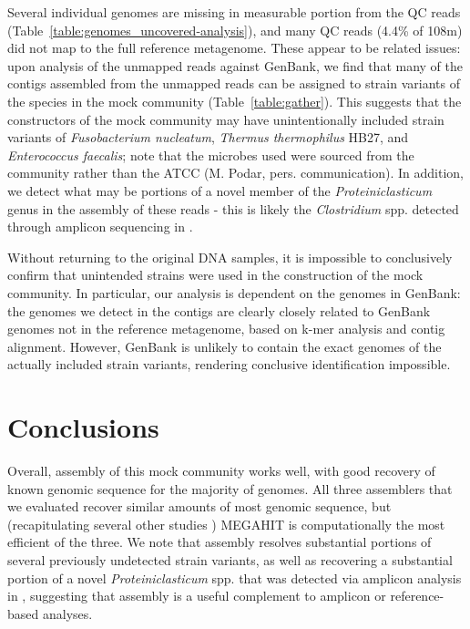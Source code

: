 \documentclass[11pt]{article}
\begin{document}
Several individual genomes are missing in measurable portion from the
QC reads (Table~\ref{table:genomes_uncovered-analysis}), and many QC
reads (4.4\% of 108m) did not map to the full reference metagenome.
These appear to be related issues: upon analysis of the unmapped reads
against GenBank, we find that many of the contigs assembled from the
unmapped reads can be assigned to strain variants of the species in
the mock community (Table~\ref{table:gather}).  This suggests that the
constructors of the mock community may have unintentionally included
strain variants of {\em Fusobacterium nucleatum}, {\em Thermus
  thermophilus} HB27, and {\em Enterococcus faecalis}; note that the
microbes used were sourced from the community rather than the ATCC
(M. Podar, pers.  communication).  In addition, we detect what may be
portions of a novel member of the {\em Proteiniclasticum} genus in the
assembly of these reads - this is likely the {\em Clostridium} spp. detected
through amplicon sequencing in \cite{podar}.

Without returning to the original DNA samples, it is impossible to
conclusively confirm that unintended strains were used in the
construction of the mock community.  In particular, our analysis is
dependent on the genomes in GenBank: the genomes we detect in the
contigs are clearly closely related to GenBank genomes not in
the reference metagenome, based on k-mer analysis and
contig alignment.  However, GenBank is unlikely to contain the exact
genomes of the actually included strain variants, rendering conclusive
identification impossible.

\section*{Conclusions}

Overall, assembly of this mock community works well, with good
recovery of known genomic sequence for the majority of genomes.  All
three assemblers that we evaluated recover similar amounts of most
genomic sequence, but (recapitulating several other studies \cite{CAMI,Vollmers2017,metag_one})
MEGAHIT is computationally the most efficient of the three.
We note that assembly
resolves substantial portions of several previously undetected strain
variants, as well as recovering a substantial portion of a novel
{\em Proteiniclasticum} spp. that was detected via amplicon analysis
in \cite{podar}, suggesting that assembly is a useful complement to amplicon
or reference-based analyses.
\end{document}
